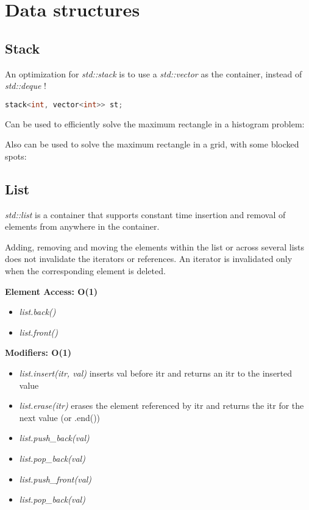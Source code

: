 \chapter{Data structures}

\section{Stack}

    An optimization for \textit{std::stack} is to use a \textit{std::vector} as the container, instead of \textit{std::deque} !

    \begin{lstlisting}[language=c++]
        stack<int, vector<int>> st;
    \end{lstlisting}

    Can be used to efficiently solve the maximum rectangle in a histogram problem:


    Also can be used to solve the maximum rectangle in a grid, with some blocked spots:


\section{List}

    \textit{std::list} is a container that supports constant time insertion and removal of elements from anywhere in the container.

    Adding, removing and moving the elements within the list or across several lists does not invalidate the iterators or references.
    An iterator is invalidated only when the corresponding element is deleted.



    \textbf{Element Access: O(1)}

    \begin{itemize}
    \item \textit{list.back()}
    \item \textit{list.front()}
    \end{itemize}

    \textbf{Modifiers: O(1)}

    \begin{itemize}
    \item \textit{list.insert(itr, val)} 
    inserts val before itr and returns an itr to the inserted value

    \item \textit{list.erase(itr)} 
    erases the element referenced by itr and returns the itr for the next value (or .end())

    \item \textit{list.push\_back(val)}
    \item \textit{list.pop\_back(val)}
    \item \textit{list.push\_front(val)}
    \item \textit{list.pop\_back(val)}
    \end{itemize}
    
